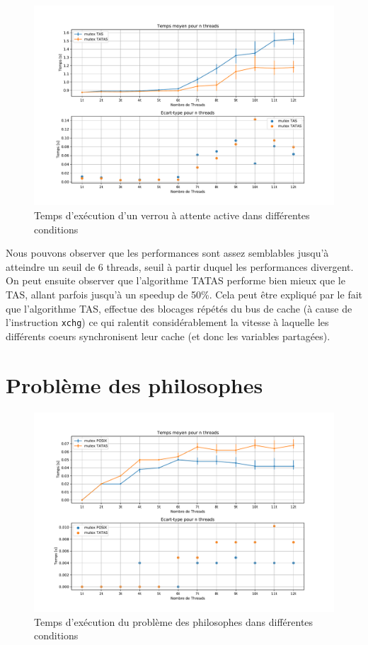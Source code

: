 \begin{figure}[h!]
    \centering
    \includegraphics[scale=0.5]{img/spinlock.pdf}
    \caption{Temps d'exécution d'un verrou à attente active dans différentes conditions}
    \label{pic:spinlock}
\end{figure}

Nous pouvons observer que les performances sont assez semblables jusqu'à atteindre un seuil de 6 threads, seuil à partir duquel les performances divergent.
On peut ensuite observer que l'algorithme TATAS performe bien mieux que le TAS, allant parfois jusqu'à un speedup de 50\%. 
Cela peut être expliqué par le fait que l'algorithme TAS, effectue des blocages répétés du bus de cache (à cause de l'instruction \texttt{xchg}) ce qui ralentit considérablement la vitesse à laquelle les différents coeurs synchronisent leur cache (et donc les variables partagées).

\section{Problème des philosophes}

\begin{figure}[h!]
    \centering
    \includegraphics[scale=0.5]{img/philosophes.pdf}
    \caption{Temps d'exécution du problème des philosophes dans différentes conditions}
    \label{pic:philo}
\end{figure}


